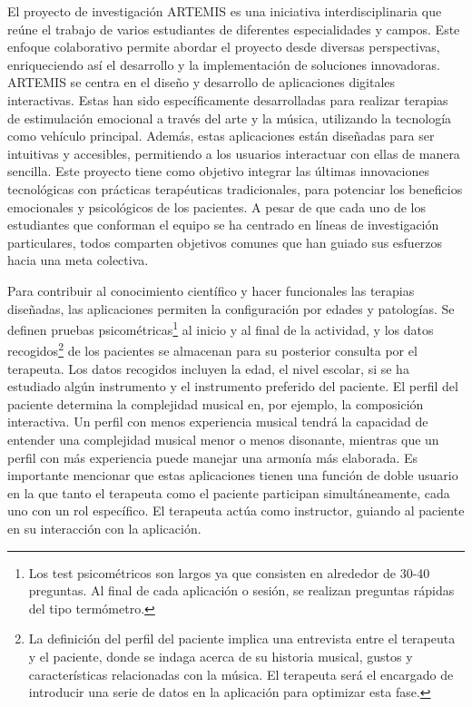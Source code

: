 El proyecto de investigación ARTEMIS es una iniciativa interdisciplinaria que reúne el trabajo de varios estudiantes de diferentes especialidades y campos. Este enfoque colaborativo permite abordar el proyecto desde diversas perspectivas, enriqueciendo así el desarrollo y la implementación de soluciones innovadoras. ARTEMIS se centra en el diseño y desarrollo de aplicaciones digitales interactivas. Estas han sido específicamente desarrolladas para realizar terapias de estimulación emocional a través del arte y la música, utilizando la tecnología como vehículo principal. Además, estas aplicaciones están diseñadas para ser intuitivas y accesibles, permitiendo a los usuarios interactuar con ellas de manera sencilla. Este proyecto tiene como objetivo integrar las últimas innovaciones tecnológicas con prácticas terapéuticas tradicionales, para potenciar los beneficios emocionales y psicológicos de los pacientes. A pesar de que cada uno de los estudiantes que conforman el equipo se ha centrado en líneas de investigación particulares, todos comparten objetivos comunes que han guiado sus esfuerzos hacia una meta colectiva.

Para contribuir al conocimiento científico y hacer funcionales las terapias diseñadas, las aplicaciones permiten la configuración por edades y patologías. Se definen pruebas psicométricas\footnote{Los test psicométricos son largos ya que consisten en alrededor de 30-40 preguntas. Al final de cada aplicación o sesión, se realizan preguntas rápidas del tipo termómetro.} al inicio y al final de la actividad, y los datos recogidos\footnote{La definición del perfil del paciente implica una entrevista entre el terapeuta y el paciente, donde se indaga acerca de su historia musical, gustos y características relacionadas con la música. El terapeuta será el encargado de introducir una serie de datos en la aplicación para optimizar esta fase.} de los pacientes se almacenan para su posterior consulta por el terapeuta. Los datos recogidos incluyen la edad, el nivel escolar, si se ha estudiado algún instrumento y el instrumento preferido del paciente. El perfil del paciente determina la complejidad musical en, por ejemplo, la composición interactiva. Un perfil con menos experiencia musical tendrá la capacidad de entender una complejidad musical menor o menos disonante, mientras que un perfil con más experiencia puede manejar una armonía más elaborada. Es importante mencionar que estas aplicaciones tienen una función de doble usuario en la que tanto el terapeuta como el paciente participan simultáneamente, cada uno con un rol específico. El terapeuta actúa como instructor, guiando al paciente en su interacción con la aplicación. 

